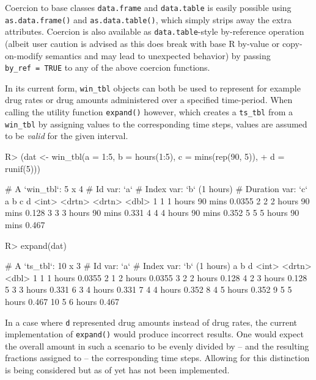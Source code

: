 \documentclass[
  notitle]{jss}
\begin{document}
Coercion to base classes \texttt{data.frame} and \texttt{data.table} is
easily possible using \texttt{as.data.frame()} and
\texttt{as.data.table()}, which simply strips away the extra attributes.
Coercion is also available as \texttt{data.table}-style by-reference
operation (albeit user caution is advised as this does break with base R
by-value or copy-on-modify semantics and may lead to unexpected
behavior) by passing \texttt{by\_ref\ =\ TRUE} to any of the above
coercion functions.

In its current form, \texttt{win\_tbl} objects can both be used to
represent for example drug rates or drug amounts administered over a
specified time-period. When calling the utility function
\texttt{expand()} however, which creates a \texttt{ts\_tbl} from a
\texttt{win\_tbl} by assigning values to the corresponding time steps,
values are assumed to be \emph{valid} for the given interval.

\begin{CodeChunk}
\begin{CodeInput}
R> (dat <- win_tbl(a = 1:5, b = hours(1:5), c = mins(rep(90, 5)),
+                 d = runif(5)))
\end{CodeInput}
\begin{CodeOutput}
# A `win_tbl`:  5 x 4
# Id var:       `a`
# Index var:    `b` (1 hours)
# Duration var: `c`
      a b       c            d
  <int> <drtn>  <drtn>   <dbl>
1     1 1 hours 90 mins 0.0355
2     2 2 hours 90 mins 0.128
3     3 3 hours 90 mins 0.331
4     4 4 hours 90 mins 0.352
5     5 5 hours 90 mins 0.467
\end{CodeOutput}
\begin{CodeInput}
R> expand(dat)
\end{CodeInput}
\begin{CodeOutput}
# A `ts_tbl`: 10 x 3
# Id var:     `a`
# Index var:  `b` (1 hours)
       a b            d
   <int> <drtn>   <dbl>
 1     1 1 hours 0.0355
 2     1 2 hours 0.0355
 3     2 2 hours 0.128
 4     2 3 hours 0.128
 5     3 3 hours 0.331
 6     3 4 hours 0.331
 7     4 4 hours 0.352
 8     4 5 hours 0.352
 9     5 5 hours 0.467
10     5 6 hours 0.467
\end{CodeOutput}
\end{CodeChunk}

In a case where \texttt{d} represented drug amounts instead of drug
rates, the current implementation of \texttt{expand()} would produce
incorrect results. One would expect the overall amount in such a
scenario to be evenly divided by -- and the resulting fractions assigned
to -- the corresponding time steps. Allowing for this distinction is
being considered but as of yet has not been implemented.
\end{document}
